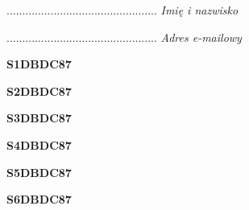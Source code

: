 \begin{turn}{90}\begin{minipage}{\linewidth} \vspace{20mm} ................................................  \textit{Imię i nazwisko}\end{minipage}\end{turn}

\begin{turn}{90}\begin{minipage}{\linewidth} \vspace{20mm} ................................................  \textit{Adres e-mailowy}\end{minipage}\end{turn}

\begin{turn}{90}\huge \begin{minipage}{\linewidth} \vspace{10mm}\textbf{S1DBDC87}\end{minipage}\end{turn}

\begin{turn}{90}\huge \begin{minipage}{\linewidth} \vspace{10mm}\textbf{S2DBDC87}\end{minipage}\end{turn}

\begin{turn}{90}\huge \begin{minipage}{\linewidth} \vspace{10mm}\textbf{S3DBDC87}\end{minipage}\end{turn}

\begin{turn}{90}\huge \begin{minipage}{\linewidth} \vspace{10mm}\textbf{S4DBDC87}\end{minipage}\end{turn}

\begin{turn}{90}\huge \begin{minipage}{\linewidth} \vspace{10mm}\textbf{S5DBDC87}\end{minipage}\end{turn}

\begin{turn}{90}\huge \begin{minipage}{\linewidth} \vspace{10mm}\textbf{S6DBDC87}\end{minipage}\end{turn}

